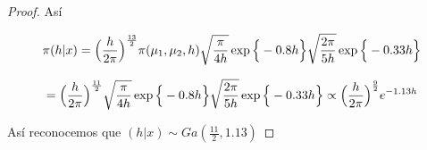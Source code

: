 \documentclass[11pt,letterpaper]{article}
\begin{document}
\begin{proof}
    Así 

    \begin{equation*}
        \pi(h|x)=\Big{(}\frac{h}{2\pi}\Big{)}^\frac{13}{2}\pi(\mu_1,\mu_2,h)\sqrt\frac{\pi}{4h}\exp\Big{\{}-0.8h\Big{\}}\sqrt{\frac{2\pi}{5h}}\exp\Big{\{}-0.33h\Big{\}}
    \end{equation*}

    \begin{equation*}
        =\Big{(}\frac{h}{2\pi}\Big{)}^\frac{11}{2}\sqrt\frac{\pi}{4h}\exp\Big{\{}-0.8h\Big{\}}\sqrt{\frac{2\pi}{5h}}\exp\Big{\{}-0.33h\Big{\}}\propto\Big{(}\frac{h}{2\pi}\Big{)}^\frac{9}{2}e^{-1.13h}
    \end{equation*}

    Así reconocemos que $(h|x)\sim Ga(\frac{11}{2},1.13)$

    
\end{proof}
\end{document}
